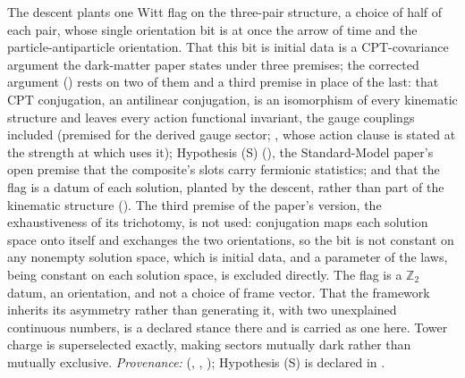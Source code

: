 The descent plants one Witt flag on the three-pair structure, a choice of half of each pair, whose single orientation bit is at once the arrow of time and the particle-antiparticle orientation. That this bit is initial data is a CPT-covariance argument the dark-matter paper states under three premises; the corrected argument () rests on two of them and a third premise in place of the last: that CPT conjugation, an antilinear conjugation, is an isomorphism of every kinematic structure and leaves every action functional invariant, the gauge couplings included (premised for the derived gauge sector; , whose action clause is stated at the strength at which  uses it); Hypothesis (S) (), the Standard-Model paper's open premise that the composite's slots carry fermionic statistics; and that the flag is a datum of each solution, planted by the descent, rather than part of the kinematic structure (). The third premise of the paper's version, the exhaustiveness of its trichotomy, is not used: conjugation maps each solution space onto itself and exchanges the two orientations, so the bit is not constant on any nonempty solution space, which is initial data, and a parameter of the laws, being constant on each solution space, is excluded directly. The flag is a $\mathbb{Z}_{2}$ datum, an orientation, and not a choice of frame vector. That the framework inherits its asymmetry rather than generating it, with two unexplained continuous numbers, is a declared stance there and is carried as one here. Tower charge is superselected exactly, making sectors mutually dark rather than mutually exclusive. \emph{Provenance:} \cite[Def.~2.10, Prop.~4.1, Prop.~5.1 (stance), Prop.~5.2 (stated under three premises; the corrected argument replaces the exhaustiveness premise by the flag as a datum)]{ButlerT14} (, , ); Hypothesis (S) is declared in \cite[\S5]{ButlerT12}.
